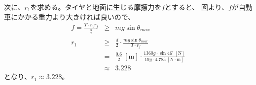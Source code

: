 \documentclass[titlepage]{jsarticle}
\begin{document}
次に、$r_1$を求める。タイヤと地面に生じる摩擦力を$f$とすると、
図より、$f$が自動車にかかる重力より大きければ良いので、
\begin{eqnarray*}
  f = \frac{T \cdot r_1r_f}{\frac{d}{2}} &\geq& mg\sin \theta_{max} \\
  r_1 &\geq& \frac{d}{2} \cdot \frac{mg\sin \theta_{max}}{T \cdot r_f} \\
  &=& \frac{0.6}{2} \ [\mathrm m] \cdot \frac{1360g \cdot \sin 46^\circ \ [\mathrm N]}{19g \cdot 4.785 \ [\mathrm{N \cdot m}]} \\
  &\approx& 3.228
\end{eqnarray*}
となり、$r_1 \approx 3.228$。
\end{document}
